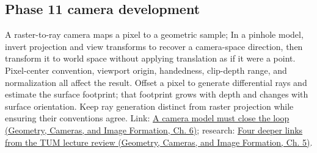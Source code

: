 \subsection{Phase 11 camera development}\label{appendix-1c07d64f5e70-phase-11-camera-development}

A raster-to-ray camera maps a pixel to a geometric sample; In a pinhole model, invert projection and view transforms to recover a camera-space direction, then transform it to world space without applying translation as if it were a point. Pixel-center convention, viewport origin, handedness, clip-depth range, and normalization all affect the result. Offset a pixel to generate differential rays and estimate the surface footprint; that footprint grows with depth and changes with surface orientation. Keep ray generation distinct from raster projection while ensuring their conventions agree. Link: \href{../03-Geometry-Cameras-and-Image-Formation/main.pdf\#nameddest=02-foundations-ii-ch037-a-camera-model-must-close-the-loop}{A camera model must close the loop (Geometry, Cameras, and Image Formation, Ch. 6)}; research: \href{../03-Geometry-Cameras-and-Image-Formation/main.pdf\#nameddest=02-foundations-ii-ch036-four-deeper-links-from-the-tum-lecture-review}{Four deeper links from the TUM lecture review (Geometry, Cameras, and Image Formation, Ch. 5)}.
